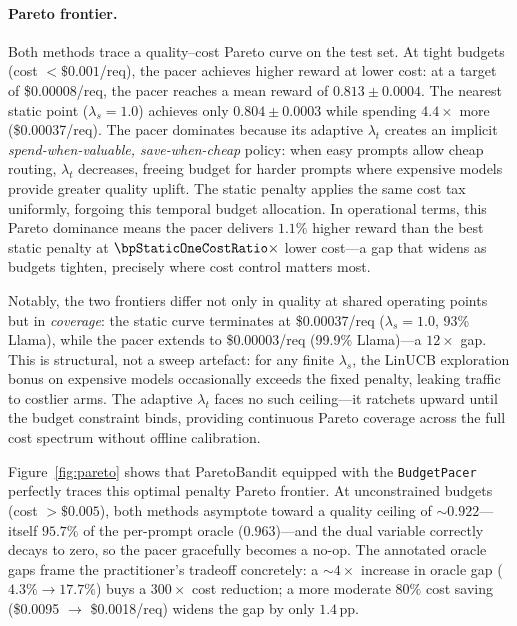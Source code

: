 \paragraph{Pareto frontier.} Both methods trace a quality--cost Pareto curve on the test set. At tight budgets (cost $< \$0.001$/req), the pacer achieves higher reward at lower cost: at a target of \$0.00008/req, the pacer reaches a mean reward of $0.813 \pm 0.0004$. The nearest static point ($\lambda_s{=}1.0$) achieves only $0.804 \pm 0.0003$ while spending $4.4\times$ more (\$0.00037/req). The pacer dominates because its adaptive $\lambda_t$ creates an implicit \emph{spend-when-valuable, save-when-cheap} policy: when easy prompts allow cheap routing, $\lambda_t$ decreases, freeing budget for harder prompts where expensive models provide greater quality uplift. The static penalty applies the same cost tax uniformly, forgoing this temporal budget allocation. In operational terms, this Pareto dominance means the pacer delivers $1.1\%$ higher reward than the best static penalty at $\bpStaticOneCostRatio\times$ lower cost---a gap that widens as budgets tighten, precisely where cost control matters most.

Notably, the two frontiers differ not only in quality at shared operating points but in \emph{coverage}: the static curve terminates at \$0.00037/req ($\lambda_s{=}1.0$, 93\% Llama), while the pacer extends to \$0.00003/req (99.9\% Llama)---a $12\times$ gap.  This is structural, not a sweep artefact: for any finite $\lambda_s$, the LinUCB exploration bonus on expensive models occasionally exceeds the fixed penalty, leaking traffic to costlier arms.  The adaptive $\lambda_t$ faces no such ceiling---it ratchets upward until the budget constraint binds, providing continuous Pareto coverage across the full cost spectrum without offline calibration.

Figure~\ref{fig:pareto} shows that ParetoBandit equipped with the {\tt BudgetPacer} perfectly traces this optimal penalty Pareto frontier. At unconstrained budgets (cost $> \$0.005$), both methods asymptote toward a quality ceiling of ${\sim}0.922$---itself $95.7\%$ of the per-prompt oracle ($0.963$)---and the dual variable correctly decays to zero, so the pacer gracefully becomes a no-op.  The annotated oracle gaps frame the practitioner's tradeoff concretely: a ${\sim}4\times$ increase in oracle gap ($4.3\% \to 17.7\%$) buys a $300\times$ cost reduction; a more moderate $80\%$ cost saving (\$0.0095 $\to$ \$0.0018/req) widens the gap by only $1.4$\,pp.

